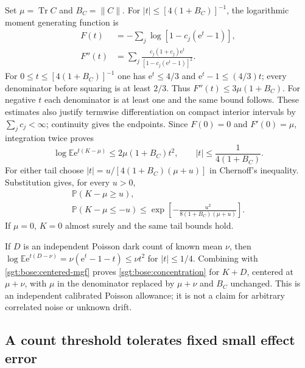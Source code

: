 \documentclass[aps,pra,reprint,superscriptaddress,longbibliography]{revtex4-2}
\newcommand{\Tr}{\operatorname{Tr}}
\newcommand{\ee}{\mathrm e}
\begin{document}
Set $\mu=\Tr C$ and $B_C=\|C\|$.  For
$|t|\le[4(1+B_C)]^{-1}$, the logarithmic moment generating function is
\begin{align}
 F(t)&=-\sum_j\log[1-c_j(\ee^t-1)],\nonumber\\
 F''(t)&=\sum_j
       \frac{c_j(1+c_j)\ee^t}{[1-c_j(\ee^t-1)]^2}.
 \label{sgt:bose:mgf}
\end{align}
For $0\le t\le[4(1+B_C)]^{-1}$ one has
$\ee^t\le4/3$ and $\ee^t-1\le(4/3)t$; every denominator before
squaring is at least $2/3$.  Thus
$F''(t)\le3\mu(1+B_C)$.  For negative $t$ each denominator is at
least one and the same bound follows.  These estimates also justify
termwise differentiation on compact interior intervals by
$\sum_jc_j<\infty$; continuity gives the endpoints.  Since
$F(0)=0$ and $F'(0)=\mu$, integration twice proves
\begin{equation}
 \log\mathbb E\ee^{t(K-\mu)}
       \le2\mu(1+B_C)t^2,
 \qquad |t|\le\frac1{4(1+B_C)}.
 \label{sgt:bose:centered-mgf}
\end{equation}
For either tail choose
$|t|=u/[4(1+B_C)(\mu+u)]$ in Chernoff's inequality.  Substitution
gives, for every $u>0$,
\begin{equation}
\begin{gathered}
 \mathbb P(K-\mu\ge u),\\
\mathbb P(K-\mu\le-u)
   \le\exp\!\left[-\frac{u^2}
                         {8(1+B_C)(\mu+u)}\right].
 \label{sgt:bose:concentration}
\end{gathered}
\end{equation}
If $\mu=0$, $K=0$ almost surely and the same tail bounds hold.

If $D$ is an independent Poisson dark count of known mean $\nu$, then
$\log\mathbb E\ee^{t(D-\nu)}=\nu(\ee^t-1-t)\le\nu t^2$ for
$|t|\le1/4$.  Combining with \eqref{sgt:bose:centered-mgf} proves
\eqref{sgt:bose:concentration} for $K+D$, centered at $\mu+\nu$,
with $\mu$ in the denominator replaced by $\mu+\nu$ and $B_C$
unchanged.  This is an independent calibrated Poisson allowance;
it is not a claim for arbitrary correlated noise or unknown drift.

\subsection{A count threshold tolerates fixed small effect error}
\label{sgt:bose:unfiltered}
\end{document}
